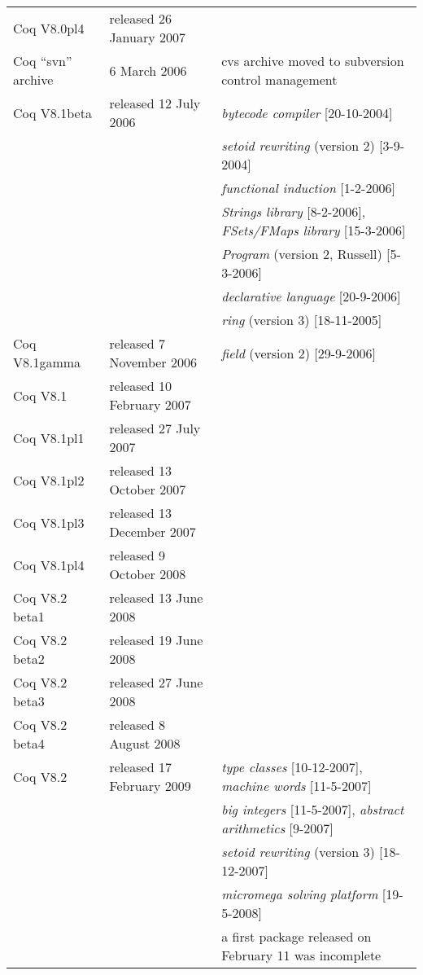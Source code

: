 \documentclass[a4paper]{book}
\newcommand{\feature}[1]{{\em #1}}
\begin{document}
\begin{tabular}{l|l|l}
Coq V8.0pl4& released 26 January 2007\\

Coq ``svn'' archive & 6 March 2006 & cvs archive moved to subversion control management\\

Coq V8.1beta& released 12 July 2006 & \feature{bytecode compiler} [20-10-2004] \\
  & & \feature{setoid rewriting} (version 2) [3-9-2004]\\
  & & \feature{functional induction} [1-2-2006]\\
  & & \feature{Strings library} [8-2-2006], \feature{FSets/FMaps library} [15-3-2006] \\
  & & \feature{Program} (version 2, Russell) [5-3-2006] \\
  & & \feature{declarative language} [20-9-2006]\\
  & & \feature{ring} (version 3) [18-11-2005]\\

Coq V8.1gamma& released 7 November 2006 & \feature{field} (version 2) [29-9-2006]\\

Coq V8.1& released 10 February 2007 & \\

Coq V8.1pl1& released 27 July 2007 & \\
Coq V8.1pl2& released 13 October 2007 & \\
Coq V8.1pl3& released 13 December 2007 & \\
Coq V8.1pl4& released 9 October 2008 & \\

Coq V8.2 beta1& released 13 June 2008 & \\
Coq V8.2 beta2& released 19 June 2008 & \\
Coq V8.2 beta3& released 27 June 2008 & \\
Coq V8.2 beta4& released 8 August 2008 & \\

Coq V8.2 & released 17 February 2009 & \feature{type classes} [10-12-2007], \feature{machine words} [11-5-2007]\\
  & & \feature{big integers} [11-5-2007], \feature{abstract arithmetics} [9-2007]\\
  & & \feature{setoid rewriting} (version 3) [18-12-2007] \\
  & & \feature{micromega solving platform} [19-5-2008]\\

& & a first package released on
February 11 was incomplete\\
\end{tabular}
\end{document}
